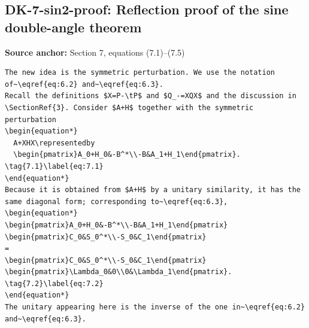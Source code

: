 \subsection*{DK-7-sin2-proof: Reflection proof of the sine double-angle theorem}
\noindent\textbf{Source anchor:} Section 7, equations (7.1)–(7.5)\\
\begin{verbatim}
The new idea is the symmetric perturbation. We use the notation of~\eqref{eq:6.2} and~\eqref{eq:6.3}.
Recall the definitions $X=P-\tP$ and $Q_-=XQX$ and the discussion in \SectionRef{3}. Consider $A+H$ together with the symmetric perturbation
\begin{equation*}
  A+XHX\representedby
  \begin{pmatrix}A_0+H_0&-B^*\\-B&A_1+H_1\end{pmatrix}.
\tag{7.1}\label{eq:7.1}
\end{equation*}
Because it is obtained from $A+H$ by a unitary similarity, it has the same diagonal form; corresponding to~\eqref{eq:6.3},
\begin{equation*}
\begin{pmatrix}A_0+H_0&-B^*\\-B&A_1+H_1\end{pmatrix}
\begin{pmatrix}C_0&S_0^*\\-S_0&C_1\end{pmatrix}
=
\begin{pmatrix}C_0&S_0^*\\-S_0&C_1\end{pmatrix}
\begin{pmatrix}\Lambda_0&0\\0&\Lambda_1\end{pmatrix}.
\tag{7.2}\label{eq:7.2}
\end{equation*}
The unitary appearing here is the inverse of the one in~\eqref{eq:6.2} and~\eqref{eq:6.3}.


\end{verbatim}
